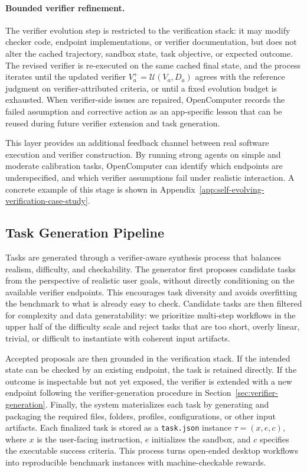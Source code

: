 \paragraph{Bounded verifier refinement.} The verifier evolution step is restricted to the verification stack:
it may modify checker code, endpoint implementations, or verifier documentation,
but does not alter the cached trajectory, sandbox state, task objective, or expected outcome.
The revised verifier is re-executed on the same cached final state, and the process iterates
until the updated verifier $V_a^+ = \mathcal{U}(V_a, D_a)$ agrees with the reference judgment
on verifier-attributed criteria, or until a fixed evolution budget is exhausted.
When verifier-side issues are repaired, OpenComputer records the failed assumption and
corrective action as an app-specific lesson that can be reused during future verifier extension
and task generation.

This layer provides an additional feedback channel between real software
execution and verifier construction. By running strong agents on simple and
moderate calibration tasks, OpenComputer can identify which endpoints are underspecified, and
which verifier assumptions fail under realistic interaction. A concrete example of this stage is shown in Appendix~\ref{app:self-evolving-verification-case-study}.


\subsection{Task Generation Pipeline}

Tasks are generated through a verifier-aware synthesis process that balances realism, difficulty, and checkability. The generator first proposes candidate tasks from the perspective of realistic user goals, without directly conditioning on the available verifier endpoints. This encourages task diversity and avoids overfitting the benchmark to what is already easy to check. Candidate tasks are then filtered for complexity and data generatability: we prioritize multi-step workflows in the upper half of the difficulty scale and reject tasks that are too short, overly linear, trivial, or difficult to instantiate with coherent input artifacts.

Accepted proposals are then grounded in the verification stack. If the intended state can be checked by an existing endpoint, the task is retained directly. If the outcome is inspectable but not yet exposed, the verifier is extended with a new endpoint following the verifier-generation procedure in Section~\ref{sec:verifier-generation}. Finally, the system materializes each task by generating and packaging the required files, folders, profiles, configurations, or other input artifacts. Each finalized task is stored as a \texttt{task.json} instance $\tau=(x,e,c)$, where $x$ is the user-facing instruction, $e$ initializes the sandbox, and $c$ specifies the executable success criteria. This process turns open-ended desktop workflows into reproducible benchmark instances with machine-checkable rewards.

